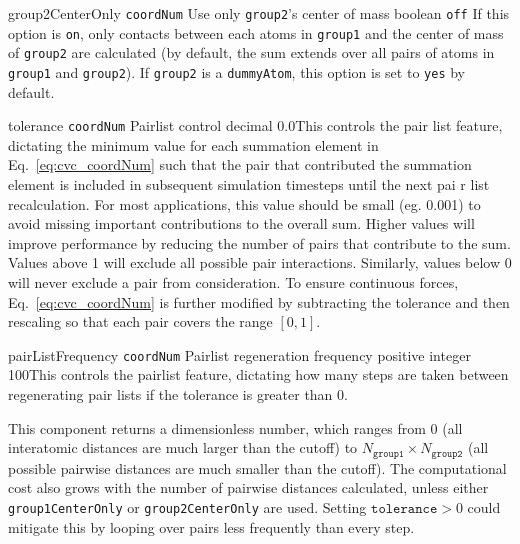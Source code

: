 \begin{cvcoptions}
\item %
  \keydef
    {group2CenterOnly}{%
    \texttt{coordNum}}{%
    Use only \texttt{group2}'s center of
    mass}{%
    boolean}{%
    \texttt{off}}{%
    If this option is \texttt{on}, only contacts between each atoms in \texttt{group1} and the center of mass of     \texttt{group2} are calculated (by default, the sum extends over all pairs of atoms in \texttt{group1} and \texttt{group2}).
    If \texttt{group2} is a \texttt{dummyAtom}, this option is set to \texttt{yes} by default.
}

\item %
    \keydef
     {tolerance}{%
     \texttt{coordNum}}{%
     Pairlist control}{%
    decimal}{%
    0.0}{This controls the pair  list feature, dictating the minimum value for each summation element in Eq.~\ref{eq:cvc_coordNum} such that the pair that contributed the summation element is included in subsequent simulation timesteps until the next pai r list recalculation. For most applications, this value should be small (eg. 0.001) to avoid missing important contributions to the overall sum. Higher values will improve performance by reducing the number of pairs that contribute to the sum. Values above 1 will exclude all possible pair interactions. Similarly, values below 0 will never exclude a pair from consideration. To ensure continuous forces, Eq.~\ref{eq:cvc_coordNum} is further modified by subtracting the tolerance and then rescaling so that each pair covers the range $\left[0, 1\right]$.
  }

\item %
    \keydef
     {pairListFrequency}{%
     \texttt{coordNum}}{%
     Pairlist regeneration frequency}{%
    positive integer}{%
    100}{This controls the pairlist feature, dictating how many steps are taken between regenerating pair  lists if the tolerance is greater than 0.
  }

\end{cvcoptions}

This component returns a dimensionless number, which ranges from 0 (all interatomic distances are much larger than the cutoff) to $N_{\mathtt{group1}} \times N_{\mathtt{group2}}$ (all possible pairwise distances are much smaller than the cutoff).
The computational cost also grows with the number of pairwise distances calculated, unless either \texttt{group1CenterOnly} or \texttt{group2CenterOnly} are used.
Setting $\mathtt{tolerance} > 0$ could mitigate this by looping over pairs less frequently than every step.



